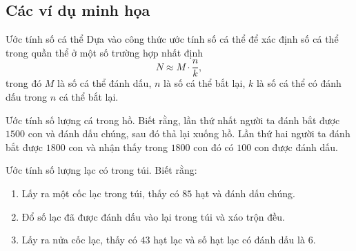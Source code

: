\subsection{Các ví dụ minh họa}
\begin{dang}{Ước tính số cá thể}
	Dựa vào công thức ước tính số cá thể để xác định số cá thể trong quần thể ở một số trường hợp nhất định
		\[N\approx M\cdot \dfrac{n}{k},\]
	trong đó $M$ là số cá thể đánh dấu, $n$ là số cá thể bắt lại, $k$ là số cá thể có đánh dấu trong $n$ cá thể bắt lại.
\end{dang}
\viduminhhoa
\begin{vd}
	Ước tính số lượng cá trong hồ. Biết rằng, lần thứ nhất người ta đánh bắt được $1500$ con và đánh dấu chúng, sau đó thả lại xuống hồ. Lần thứ hai người ta đánh bắt được $1800$ con và nhận thấy trong $1800$ con đó có $100$ con được đánh dấu.
\end{vd}
\begin{vd}
	Ước tính số lượng lạc có trong túi. Biết rằng:
	\begin{enumerate}
	\item Lấy ra một cốc lạc trong túi, thấy có $ 85 $ hạt và đánh dấu chúng.
	\item Đổ số lạc đã được đánh dấu vào lại trong túi và xáo trộn đều.
	\item Lấy ra nửa cốc lạc, thấy có $ 43 $ hạt lạc và số hạt lạc có đánh dấu là $6$.
	\end{enumerate}
\end{vd}

